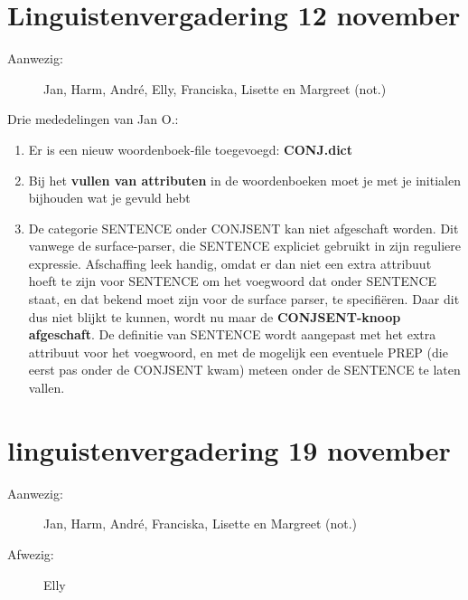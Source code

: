 
   \RosSupersedes{-}
   \MakeRosTitle
%
%
\section{Linguistenvergadering 12 november}

\begin{description}
\item [Aanwezig:] Jan, Harm, Andr\'{e}, Elly, Franciska, Lisette en Margreet 
(not.)
\end{description}

\noindent
Drie mededelingen van Jan O.:
\begin{enumerate}
  \item Er is een nieuw woordenboek-file toegevoegd: {\bf CONJ.dict}
  \item Bij het {\bf vullen van attributen} in de woordenboeken moet je met je 
initialen bijhouden wat je gevuld hebt
  \item De categorie SENTENCE onder CONJSENT kan niet afgeschaft worden. Dit 
vanwege de 
surface-parser, die SENTENCE expliciet gebruikt in zijn reguliere expressie. 
Afschaffing leek handig, omdat 
er dan niet een extra attribuut hoeft te zijn voor SENTENCE om het 
voegwoord dat onder SENTENCE staat, en dat bekend moet zijn voor de surface 
parser, te specifi\"{e}ren.
Daar dit dus niet blijkt te kunnen, wordt nu maar de {\bf CONJSENT-knoop 
afgeschaft}. De definitie van SENTENCE wordt
aangepast met het extra attribuut voor het voegwoord, en met de mogelijk een 
eventuele PREP (die eerst pas onder de CONJSENT kwam) 
meteen onder de SENTENCE te laten vallen. 
\end{enumerate}

\section{linguistenvergadering 19 november}

\begin{description}
\item [Aanwezig:] Jan, Harm, Andr\'{e}, Franciska, Lisette en Margreet (not.)
\item [Afwezig:] Elly
\end{description}

